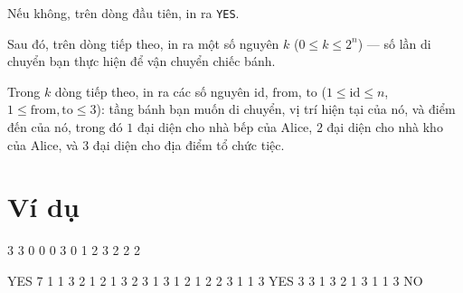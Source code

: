 \documentclass[12pt,a4paper]{article}
\begin{document}
Nếu không, trên dòng đầu tiên, in ra \texttt{YES}.

Sau đó, trên dòng tiếp theo, in ra một số nguyên $k$ ($0 \le k \le 2^n$) — số lần di chuyển bạn thực hiện để vận chuyển chiếc bánh.

Trong $k$ dòng tiếp theo, in ra các số nguyên $\mathrm{id}$, $\mathrm{from}$, $\mathrm{to}$ ($1 \le \mathrm{id} \le n$, $1 \le \mathrm{from}, \mathrm{to} \le 3$): tầng bánh bạn muốn di chuyển, vị trí hiện tại của nó, và điểm đến của nó, trong đó $1$ đại diện cho nhà bếp của Alice, $2$ đại diện cho nhà kho của Alice, và $3$ đại diện cho địa điểm tổ chức tiệc.

\section*{Ví dụ}

\begin{inputbox}
3
3
0 0 0
3
0 1 2
3
2 2 2
\end{inputbox}\begin{outputbox}
YES
7
1 1 3
2 1 2
1 3 2
3 1 3
1 2 1
2 2 3
1 1 3
YES
3
3 1 3
2 1 3
1 1 3
NO
\end{outputbox}%
\end{document}
